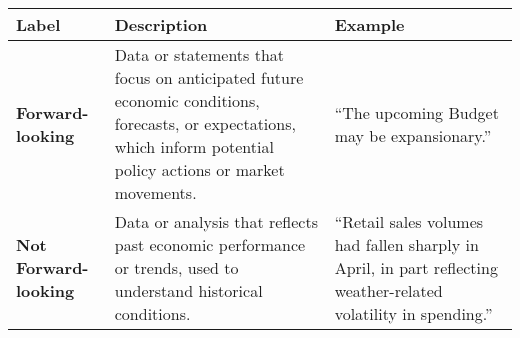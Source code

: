 \begin{table*}
    \caption{}
    \vspace{1em}
    \begin{tabular}{p{}p{}p{}}
    \toprule
    \textbf{Label} & \textbf{Description} & \textbf{Example}\\
    \midrule
    \textbf{Forward-looking} & Data or statements that focus on anticipated future economic conditions, forecasts, or expectations, which inform potential policy actions or market movements. & “The upcoming Budget may be expansionary.” \\
    \midrule
    \textbf{Not Forward-looking} & Data or analysis that reflects past economic performance or trends, used to understand historical conditions. & “Retail sales volumes had fallen sharply in April, in part reflecting weather-related volatility in spending.” \\
    \bottomrule
    \end{tabular}
    \label{tb:boe_forward_looking_guide}
\end{table*}
    
    